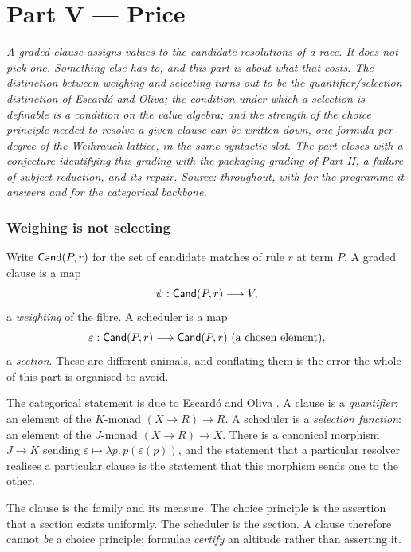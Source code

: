 \part*{Part V --- Price}

\bigskip
\noindent
\emph{A graded clause assigns values to the candidate resolutions of a race. It
does not pick one. Something else has to, and this part is about what that costs.
The distinction between weighing and selecting turns out to be the
quantifier/selection distinction of Escard\'o and Oliva; the condition under which
a selection is definable is a condition on the value algebra; and the strength of
the choice principle needed to resolve a given clause can be written down, one
formula per degree of the Weihrauch lattice, in the same syntactic slot. The part
closes with a conjecture identifying this grading with the packaging grading of
Part II, a failure of subject reduction, and its repair. Source:
\cite{ChoiceFormulae} throughout, with \cite{ChoiceScheduling} for the programme
it answers and \cite{EscardoOliva10} for the categorical backbone.}
\bigskip

\section{Weighing is not selecting}
\label{sec:weighselect}

Write $\mathsf{Cand}(P,r)$ for the set of candidate matches of rule $r$ at term $P$. A
graded clause is a map
\[
  \psi : \mathsf{Cand}(P,r) \longrightarrow V,
\]
a \emph{weighting} of the fibre. A scheduler is a map
\[
  \varepsilon : \mathsf{Cand}(P,r) \longrightarrow \mathsf{Cand}(P,r) \ \text{(a chosen element)},
\]
a \emph{section}. These are different animals, and conflating them is the error the
whole of this part is organised to avoid.

The categorical statement is due to Escard\'o and Oliva \cite{EscardoOliva10}. A
clause is a \emph{quantifier}: an element of the $K$-monad $(X \to R) \to R$. A
scheduler is a \emph{selection function}: an element of the $J$-monad
$(X \to R) \to X$. There is a canonical morphism $J \to K$ sending
$\varepsilon \mapsto \lambda p.\,p(\varepsilon(p))$, and the statement that a
particular resolver realises a particular clause is the statement that this
morphism sends one to the other.

\begin{principle}
\label{prin:division}
The clause is the family and its measure. The choice principle is the assertion
that a section exists uniformly. The scheduler is the section. A clause therefore
cannot \emph{be} a choice principle; formulae \emph{certify} an altitude rather
than asserting it.
\end{principle}

